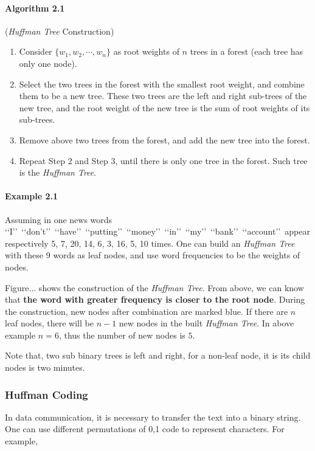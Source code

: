\paragraph{Algorithm 2.1}(\emph{Huffman Tree} Construction)
\begin{enumerate}
\item Consider $\{w_1,w_2,\cdots,w_n\}$ as root weights of $n$ trees in a forest (each tree has only one node).
\item Select the two trees in the forest with the smallest root weight, and combine them to be a new tree. These two trees are the left and right sub-trees of the new tree, and the root weight of the new tree is the sum of root weights of its sub-trees.
\item Remove above two trees from the forest, and add the new tree into the forest.
\item Repeat Step 2 and Step 3, until there is only one tree in the forest. Such tree is the \emph{Huffman Tree}.
\end{enumerate}
\paragraph{Example 2.1} Assuming in one news words \lq\lq I\rq\rq\ \lq\lq don't\rq\rq\ \lq\lq have\rq\rq\ \lq\lq putting\rq\rq\ \lq\lq money\rq\rq\ \lq\lq in\rq\rq\ \lq\lq my\rq\rq\ \lq\lq bank\rq\rq\ \lq\lq account\rq\rq\ appear respectively 5, 7, 20, 14, 6, 3, 16, 5, 10 times. One can build an \emph{Huffman Tree} with these 9 words as leaf nodes, and use word frequencies to be the weights of nodes.

Figure... shows the construction of the \emph{Huffman Tree}. From above, we can know that \textbf{the word with greater frequency is closer to the root node}. During the construction, new nodes after combination are marked blue. If there are $n$ leaf nodes, there will be $n-1$ new nodes in the built \emph{Huffman Tree}. In above example $n=6$, thus the number of new nodes is $5$. 

Note that, two sub binary trees is left and right, for a non-leaf node, it is its child nodes is two minutes.
\subsubsection{Huffman Coding}
In data communication, it is necessary to transfer the text into a binary string. One can use different permutations of 0,1 code to represent characters. For example, 



